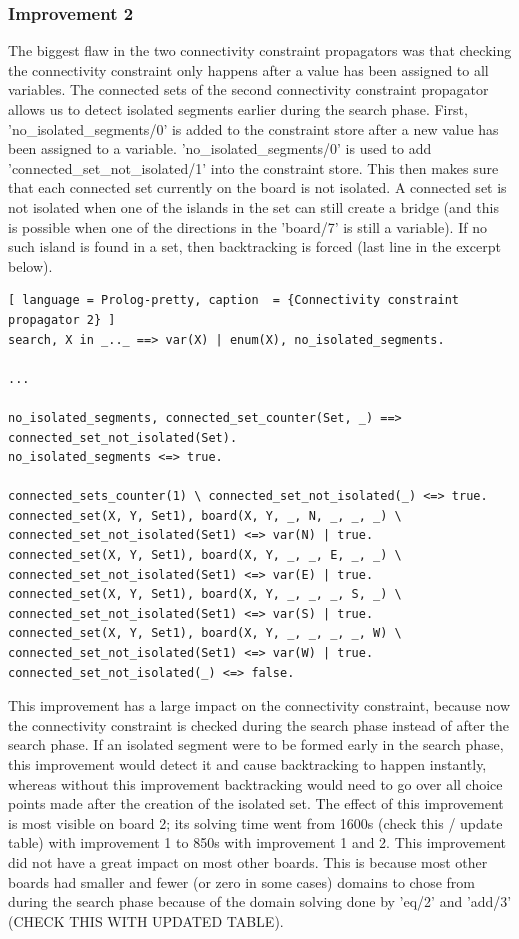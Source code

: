 \documentclass{report}
\begin{document}
\subsubsection{Improvement 2}
\label{sec:improvement2}
The biggest flaw in the two connectivity constraint propagators was that checking the connectivity constraint only happens after a value has been assigned to all variables. The connected sets of the second connectivity constraint propagator allows us to detect isolated segments earlier during the search phase. First,  'no\_isolated\_segments/0' is added to the constraint store after a new value has been assigned to a variable. 'no\_isolated\_segments/0' is used to add 'connected\_set\_not\_isolated/1' into the constraint store. This then makes sure that each connected set currently on the board is not isolated. A connected set is not isolated when one of the islands in the set can still create a bridge (and this is possible when one of the directions in the 'board/7' is still a variable). If no such island is found in a set, then backtracking is forced (last line in the excerpt below).

\begin{lstlisting}[ language = Prolog-pretty, caption  = {Connectivity constraint propagator 2} ]
search, X in _.._ ==> var(X) | enum(X), no_isolated_segments.

...

no_isolated_segments, connected_set_counter(Set, _) ==> connected_set_not_isolated(Set).
no_isolated_segments <=> true.

connected_sets_counter(1) \ connected_set_not_isolated(_) <=> true.
connected_set(X, Y, Set1), board(X, Y, _, N, _, _, _) \ connected_set_not_isolated(Set1) <=> var(N) | true.
connected_set(X, Y, Set1), board(X, Y, _, _, E, _, _) \ connected_set_not_isolated(Set1) <=> var(E) | true.
connected_set(X, Y, Set1), board(X, Y, _, _, _, S, _) \ connected_set_not_isolated(Set1) <=> var(S) | true.
connected_set(X, Y, Set1), board(X, Y, _, _, _, _, W) \ connected_set_not_isolated(Set1) <=> var(W) | true.
connected_set_not_isolated(_) <=> false.
\end{lstlisting}

This improvement has a large impact on the connectivity constraint, because now the connectivity constraint is checked during the search phase instead of after the search phase. If an isolated segment were to be formed early in the search phase, this improvement would detect it and cause backtracking to happen instantly, whereas without this improvement backtracking would need to go over all choice points made after the creation of the isolated set. The effect of this improvement is most visible on board 2; its solving time went from 1600s (check this / update table) with improvement 1 to 850s with improvement 1 and 2. This improvement did not have a great impact on most other boards. This is because most other boards had smaller and fewer (or zero in some cases) domains to chose from during the search phase because of the domain solving done by 'eq/2' and 'add/3' (CHECK THIS WITH UPDATED TABLE).
\end{document}
